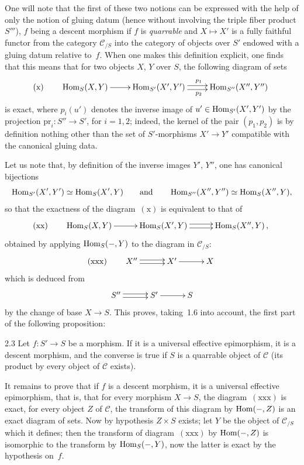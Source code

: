 One will note that the first of these two notions can be expressed with the
help of only the notion of gluing datum (hence without involving the triple
fiber product \(S'''\)), \(f\) being a descent morphism if \(f\) is
\emph{quarrable}
and \(X\mapsto X'\) is a fully faithful functor from the category
\(\mathcal{C}_{/S}\) into the category of objects over \(S'\) endowed with a
gluing datum relative to~\(f\). When one makes this definition explicit, one
finds that this means that for two objects \(X\), \(Y\) over \(S\), the
following diagram of sets
\[
(\mathrm{x})\qquad
\xymatrix@C=2.4em{
\Hom_{S}(X,Y) \ar[r]
  & \Hom_{S'}(X',Y')
      \ar@<0.55ex>[r]^{p_{1}}
      \ar@<-0.55ex>[r]_{p_{2}}
  & \Hom_{S''}(X'',Y'')
}
\]
is exact, where \(p_{i}(u')\) denotes the inverse image of
\(u'\in\operatorname{Hom}_{S'}(X',Y')\) by the projection
\(\mathrm{pr}_{i}\colon S''\to S'\), for \(i=1,2\); indeed, the kernel of
the pair \((p_{1},p_{2})\) is by definition nothing other than the set of
\(S'\)-morphisms \(X'\to Y'\) compatible with the canonical gluing data.

Let us note that, by definition of the inverse images \(Y'\), \(Y''\), one
has canonical bijections
\[
\operatorname{Hom}_{S'}(X',Y')\simeq\operatorname{Hom}_{S}(X',Y)
\qquad\text{and}\qquad
\operatorname{Hom}_{S''}(X'',Y'')\simeq\operatorname{Hom}_{S}(X'',Y),
\]
so that the exactness of the diagram~\((\mathrm{x})\) is equivalent to that
of
\[
(\mathrm{xx})\qquad
\xymatrix@C=2.8em{
\Hom_{S}(X,Y) \ar[r]
  & \Hom_{S}(X',Y)
      \ar@<0.55ex>[r]
      \ar@<-0.55ex>[r]
  & \Hom_{S}(X'',Y)\,,
}
\]
obtained by applying \(\operatorname{Hom}_{S}(-,Y)\) to the diagram in
\(\mathcal{C}_{/S}\):
\[
(\mathrm{xxx})\qquad
\xymatrix@C=3em{
X'' \ar@<0.5ex>[r] \ar@<-0.5ex>[r] & X' \ar[r] & X
}
\]
which is deduced from
\[
\xymatrix@C=3em{
S'' \ar@<0.5ex>[r] \ar@<-0.5ex>[r] & S' \ar[r] & S
}
\]
by the change of base \(X\to S\). This proves, taking~1.6 into account, the
first part of the following proposition:

\begin{proposition}{2.3}
\label{IV.2.3}
Let \(f\colon S'\to S\) be a morphism. If it is a universal effective
epimorphism, it is a descent morphism, and the converse is true if \(S\) is
a quarrable object of \(\mathcal{C}\) (\ie its product by every object of
\(\mathcal{C}\) exists).
\end{proposition}

It remains to prove that if \(f\) is a descent morphism, it is a universal
effective epimorphism, that is, that for every morphism \(X\to S\), the
diagram~\((\mathrm{xxx})\) is exact, \ie for every object \(Z\) of
\(\mathcal{C}\), the transform of this diagram by \(\operatorname{Hom}(-,Z)\) is an exact
diagram of sets. Now by hypothesis \(Z\times S\) exists; let \(Y\) be the
object of \(\mathcal{C}_{/S}\) which it defines; then the transform of
diagram~\((\mathrm{xxx})\) by \(\operatorname{Hom}(-,Z)\) is isomorphic to the transform
by \(\operatorname{Hom}_{S}(-,Y)\), now the latter is exact by the hypothesis on~\(f\).

